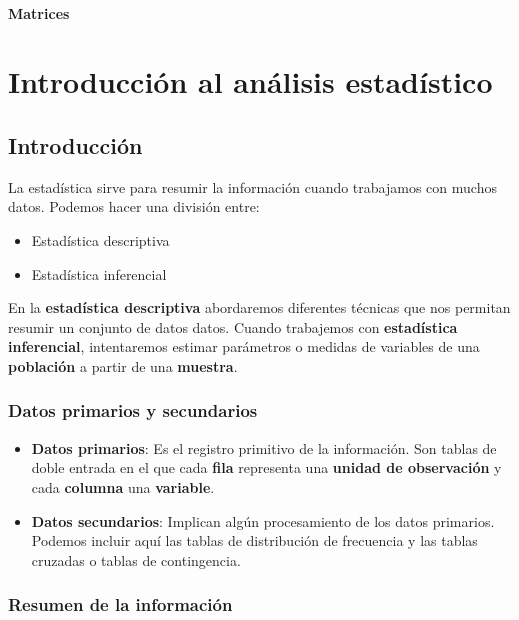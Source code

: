 \documentclass[spanish,]{book}
\providecommand{\tightlist}{%
  \setlength{\itemsep}{0pt}\setlength{\parskip}{0pt}}
\begin{document}
\subsection{Matrices}\label{matrices-1}

\part{Introducción al análisis
estadístico}\label{part-introduccion-al-analisis-estadistico}

\chapter{Introducción}\label{introduccion}

La estadística sirve para resumir la información cuando trabajamos con
muchos datos. Podemos hacer una división entre:

\begin{itemize}
\tightlist
\item
  Estadística descriptiva\\
\item
  Estadística inferencial
\end{itemize}

En la \textbf{estadística descriptiva} abordaremos diferentes técnicas
que nos permitan resumir un conjunto de datos datos. Cuando trabajemos
con \textbf{estadística inferencial}, intentaremos estimar parámetros o
medidas de variables de una \textbf{población} a partir de una
\textbf{muestra}.

\section{Datos primarios y
secundarios}\label{datos-primarios-y-secundarios}

\begin{itemize}
\item
  \textbf{Datos primarios}: Es el registro primitivo de la información.
  Son tablas de doble entrada en el que cada \textbf{fila} representa
  una \textbf{unidad de observación} y cada \textbf{columna} una
  \textbf{variable}.
\item
  \textbf{Datos secundarios}: Implican algún procesamiento de los datos
  primarios. Podemos incluir aquí las tablas de distribución de
  frecuencia y las tablas cruzadas o tablas de contingencia.
\end{itemize}

\section{Resumen de la información}\label{resumen-de-la-informacion}
\end{document}
